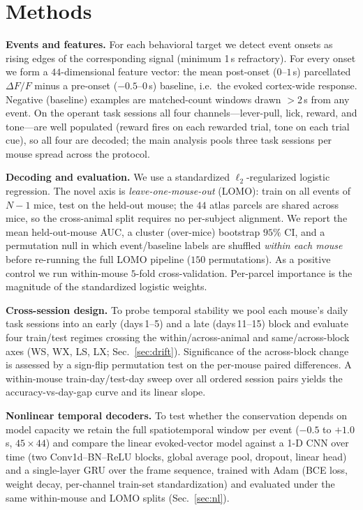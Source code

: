 \documentclass[conference]{IEEEtran}
\begin{document}
\section{Methods}
\textbf{Events and features.} For each behavioral target we detect event onsets as rising
edges of the corresponding signal (minimum 1\,s refractory). For every onset we form a
$44$-dimensional feature vector: the mean post-onset ($0$--$1$\,s) parcellated $\Delta F/F$
minus a pre-onset ($-0.5$--$0$\,s) baseline, i.e.\ the evoked cortex-wide response. Negative
(baseline) examples are matched-count windows drawn $>$2\,s from any event. On the operant task
sessions all four channels---lever-pull, lick, reward, and tone---are well populated (reward
fires on each rewarded trial, tone on each trial cue), so all four are decoded; the main analysis
pools three task sessions per mouse spread across the protocol.

\textbf{Decoding and evaluation.} We use a standardized $\ell_2$-regularized logistic
regression. The novel axis is \emph{leave-one-mouse-out} (LOMO): train on all events of $N-1$
mice, test on the held-out mouse; the $44$ atlas parcels are shared across mice, so the
cross-animal split requires no per-subject alignment. We report the mean held-out-mouse AUC,
a cluster (over-mice) bootstrap $95\%$ CI, and a permutation null in which event/baseline
labels are shuffled \emph{within each mouse} before re-running the full LOMO pipeline
($150$ permutations). As a positive control we run within-mouse $5$-fold cross-validation.
Per-parcel importance is the magnitude of the standardized logistic weights.

\textbf{Cross-session design.} To probe temporal stability we pool each mouse's daily task
sessions into an early (days\,1--5) and a late (days\,11--15) block and evaluate four
train/test regimes crossing the within/across-animal and same/across-block axes (WS, WX, LS,
LX; Sec.~\ref{sec:drift}). Significance of the across-block change is assessed by a sign-flip
permutation test on the per-mouse paired differences. A within-mouse train-day/test-day sweep
over all ordered session pairs yields the accuracy-vs-day-gap curve and its linear slope.

\textbf{Nonlinear temporal decoders.} To test whether the conservation depends on model
capacity we retain the full spatiotemporal window per event ($-0.5$ to $+1.0$\,s, $45{\times}44$)
and compare the linear evoked-vector model against a 1-D CNN over time (two Conv1d--BN--ReLU
blocks, global average pool, dropout, linear head) and a single-layer GRU over the frame
sequence, trained with Adam (BCE loss, weight decay, per-channel train-set standardization) and
evaluated under the same within-mouse and LOMO splits (Sec.~\ref{sec:nl}).
\end{document}
